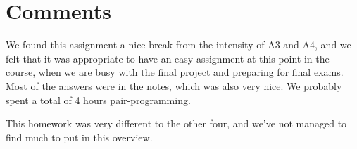 \section{Comments}
We found this assignment a nice break from the intensity of A3 and A4, and we felt that it was appropriate to have an easy assignment at this point in the course, when we are busy with the final project and preparing for final exams. Most of the answers were in the notes, which was also very nice. We probably spent a total of 4 hours pair-programming.

This homework was very different to the other four, and we've not managed to find much to put in this overview.


